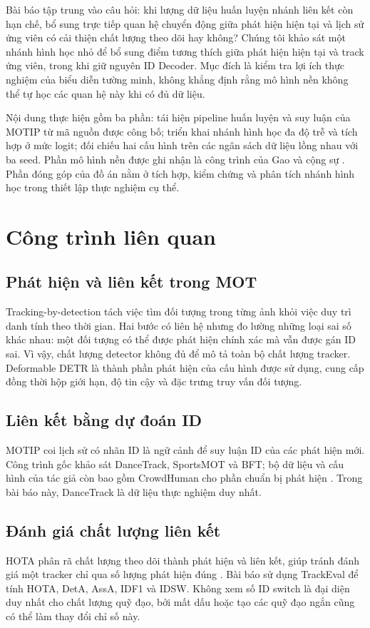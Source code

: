 Bài báo tập trung vào câu hỏi: khi lượng dữ liệu huấn luyện nhánh liên kết còn hạn chế, bổ sung trực tiếp quan hệ chuyển động giữa phát hiện hiện tại và lịch sử ứng viên có cải thiện chất lượng theo dõi hay không? Chúng tôi khảo sát một nhánh hình học nhỏ để bổ sung điểm tương thích giữa phát hiện hiện tại và track ứng viên, trong khi giữ nguyên ID Decoder. Mục đích là kiểm tra lợi ích thực nghiệm của biểu diễn tường minh, không khẳng định rằng mô hình nền không thể tự học các quan hệ này khi có đủ dữ liệu.

Nội dung thực hiện gồm ba phần: tái hiện pipeline huấn luyện và suy luận của MOTIP từ mã nguồn được công bố; triển khai nhánh hình học đa độ trễ và tích hợp ở mức logit; đối chiếu hai cấu hình trên các ngân sách dữ liệu lồng nhau với ba seed. Phần mô hình nền được ghi nhận là công trình của Gao và cộng sự \cite{motip}. Phần đóng góp của đồ án nằm ở tích hợp, kiểm chứng và phân tích nhánh hình học trong thiết lập thực nghiệm cụ thể.

\FloatBarrier
\section{Công trình liên quan}
\FloatBarrier
\subsection{Phát hiện và liên kết trong MOT}
Tracking-by-detection tách việc tìm đối tượng trong từng ảnh khỏi việc duy trì danh tính theo thời gian. Hai bước có liên hệ nhưng đo lường những loại sai số khác nhau: một đối tượng có thể được phát hiện chính xác mà vẫn được gán ID sai. Vì vậy, chất lượng detector không đủ để mô tả toàn bộ chất lượng tracker. Deformable DETR \cite{deformable} là thành phần phát hiện của cấu hình được sử dụng, cung cấp đồng thời hộp giới hạn, độ tin cậy và đặc trưng truy vấn đối tượng.

\FloatBarrier
\subsection{Liên kết bằng dự đoán ID}
MOTIP \cite{motip} coi lịch sử có nhãn ID là ngữ cảnh để suy luận ID của các phát hiện mới. Công trình gốc khảo sát DanceTrack, SportsMOT và BFT; bộ dữ liệu và cấu hình của tác giả còn bao gồm CrowdHuman cho phần chuẩn bị phát hiện \cite{motipcode}. Trong bài báo này, DanceTrack là dữ liệu thực nghiệm duy nhất.

\FloatBarrier
\subsection{Đánh giá chất lượng liên kết}
HOTA phân rã chất lượng theo dõi thành phát hiện và liên kết, giúp tránh đánh giá một tracker chỉ qua số lượng phát hiện đúng \cite{hota}. Bài báo sử dụng TrackEval \cite{trackeval} để tính HOTA, DetA, AssA, IDF1 và IDSW. Không xem số ID switch là đại diện duy nhất cho chất lượng quỹ đạo, bởi mất dấu hoặc tạo các quỹ đạo ngắn cũng có thể làm thay đổi chỉ số này.

